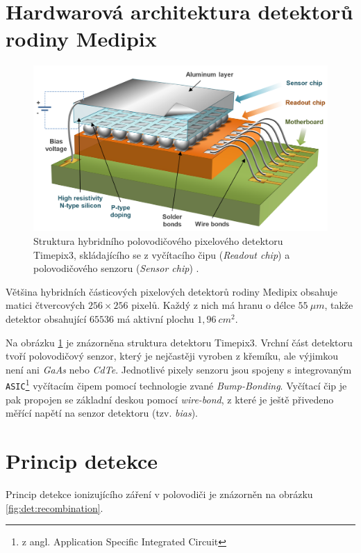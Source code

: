 \section{Hardwarová architektura detektorů rodiny Medipix}
\begin{figure}[th]
	\begin{center}
		\includegraphics[width=12cm]{figures/det_chip.png}
		\caption{Struktura hybridního polovodičového pixelového detektoru Timepix3, skládajícího se z vyčítacího čipu (\textit{Readout chip}) a polovodičového senzoru (\textit{Sensor chip}) \cite{PlatkevicDisertace}.}
		\label{fig:det:chip}
	\end{center}
\end{figure}
Většina hybridních částicových pixelových detektorů rodiny Medipix obsahuje matici čtvercových $256\times256$ pixelů. Každý z nich má hranu o délce $55~\mu m$, takže detektor obsahující $65536$ má aktivní plochu $1,96~cm^2$. 

Na obrázku \ref{fig:det:chip} je znázorněna struktura detektoru Timepix3. Vrchní část detektoru tvoří polovodičový senzor, který je nejčastěji vyroben z křemíku, ale výjimkou není ani \textit{GaAs} nebo \textit{CdTe}. Jednotlivé pixely senzoru jsou spojeny s integrovaným \texttt{ASIC}\footnote{z angl. Application Specific Integrated Circuit} vyčítacím čipem pomocí technologie zvané \textit{Bump-Bonding}. Vyčítací čip je pak propojen se základní deskou pomocí \textit{wire-bond}, z které je ještě přivedeno měřící napětí na senzor detektoru (tzv. \textit{bias}).


\section{Princip detekce}\label{chap:detectors:princip}
Princip detekce ionizujícího záření v polovodiči je znázorněn na obrázku \ref{fig:det:recombination}.

